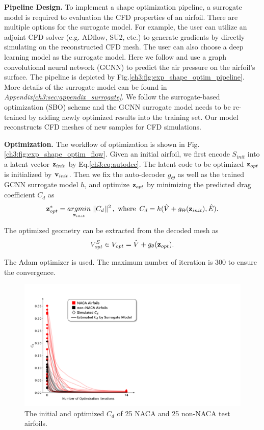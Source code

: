 \noindent \textbf{Pipeline Design.}
To implement a shape optimization pipeline, a surrogate model is required to evaluation the CFD properties of an airfoil.
There are multiple options for the surrogate model.
For example, the user can utilize an adjoint CFD solver (e.g. ADflow\cite{aa.Mader2020}, SU2\cite{aa.Economon2016}, etc.) to generate gradients by directly simulating on the reconstructed CFD mesh.
The user can also choose a deep learning model as the surrogate model.
Here we follow \cite{aa.Baque2018} and use a graph convolutional neural network (GCNN) to predict the air pressure on the airfoil's surface.
The pipeline is depicted by Fig.\ref{ch3:fig:exp_shape_optim_pipeline}.
More details of the surrogate model can be found in \textit{Appendix\ref{ch3:sec:appendix_surrogate}}.
We follow the surrogate-based optimization (SBO) scheme and the GCNN surrogate model needs to be re-trained by adding newly optimized results into the training set.
Our model reconstructs CFD meshes of new samples for CFD simulations.

\noindent \textbf{Optimization.}
The workflow of optimization is shown in Fig.\ref{ch3:fig:exp_shape_optim_flow}.
Given an initial airfoil, we first encode $S_{init}$ into a latent vector $\mathbf{z}_{init}$ by Eq.\ref{ch3:eq:autodec}.
The latent code to be optimized $\mathbf{z}_{opt}$ is initialized by $\mathbf{v}_{init}$.
Then we fix the auto-decoder $g_\Theta$ as well as the trained GCNN surrogate model $h$, and optimize $\mathbf{z}_{opt}$ by minimizing the predicted drag coefficient $C_d$ as
\begin{equation}
    \mathbf{z}_{opt}^* = \mathop{argmin}\limits_{\mathbf{z}_{init}} ||C_d||^2\,,\,\, \text{where} \,\,\,C_d = h(\hat{V} + g_\Theta(\mathbf{z}_{init}), \hat{E}).
    \label{ch3:eq:optim_without_constrain}
\end{equation}

The optimized geometry can be extracted from the decoded mesh as
\begin{equation}
    V^S_{opt} \in V_{opt} = \hat{V} + g_\theta(\mathbf{z}_{opt}).
\end{equation}

The Adam optimizer is used.
The maximum number of iteration is $300$ to ensure the convergence.

\begin{figure}[htb]
	\begin{center}
		\includegraphics[width=0.6\linewidth]{chapter3/tex/figures/experiment/shape_optimization_batch.pdf}
	\end{center}
        \vspace{-2mm}
	\caption{
		\small The initial and optimized $C_d$ of 25 NACA and 25 non-NACA test airfoils.
	}
	\label{ch3:fig:exp_shape_optim_batch}
\end{figure}

